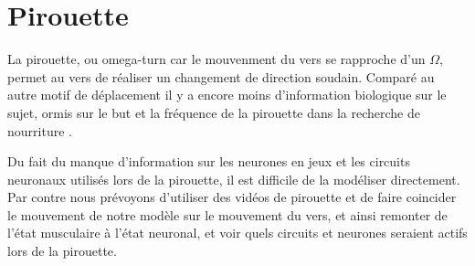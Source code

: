 
\section{Pirouette} %
\label{sec:Pirouette}

La pirouette, ou omega-turn car le mouvenment du vers se rapproche d'un $\Omega$, permet au vers
de réaliser un changement de direction soudain. Comparé au autre motif de déplacement il y a encore
moins d'information biologique sur le sujet, ormis sur le but et la fréquence de la pirouette dans
la recherche de nourriture \cite{Gray2005}.

Du fait du manque d'information sur les neurones en jeux et les circuits neuronaux utilisés lors de
la pirouette, il est difficile de la modéliser directement. Par contre nous prévoyons d'utiliser des
vidéos de pirouette et de faire coincider le mouvement de notre modèle sur le mouvement du vers, et
ainsi remonter de l'état musculaire à l'état neuronal, et voir quels circuits et neurones seraient actifs
lors de la pirouette.


